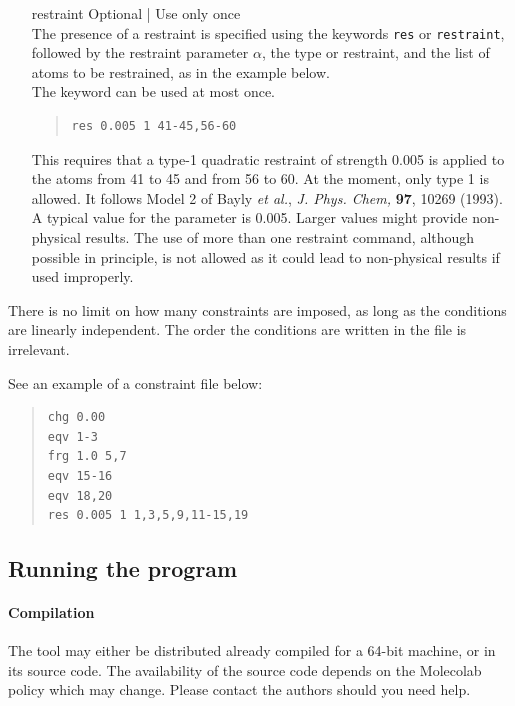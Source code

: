 \documentclass[a4paper]{report}
\begin{document}
\begin{itemize}
\item[restraint] Optional | Use only once \\
The presence of a restraint is specified using the keywords \texttt{res} or \texttt{restraint}, followed by the restraint parameter $\alpha$, the type or restraint, and the list of atoms to be restrained, as in the example below. \\
The keyword can be used at most once.
\begin{framed}
\begin{quote}
\begin{verbatim}
res 0.005 1 41-45,56-60
\end{verbatim}
\end{quote}
\end{framed}
This requires that a type-1 quadratic restraint of strength 0.005 is applied to the atoms from 41 to 45 and from 56 to 60. At the moment, only type 1 is allowed. It follows Model 2 of Bayly \emph{et al.}, \emph{J. Phys. Chem,} \textbf{97}, 10269 (1993). A typical value for the parameter is 0.005. Larger values might provide non-physical results. The use of more than one restraint command, although possible in principle, is not allowed as it could lead to non-physical results if used improperly.

\end{itemize}

There is no limit on how many constraints are imposed, as long as the conditions are
linearly independent. The order the conditions are written in the file is irrelevant.

See an example of a constraint file below:
\begin{framed}
\begin{quote}
\begin{verbatim}
chg 0.00
eqv 1-3
frg 1.0 5,7
eqv 15-16
eqv 18,20
res 0.005 1 1,3,5,9,11-15,19
\end{verbatim}
\end{quote}
\end{framed}

\subsection*{Running the program}

\paragraph*{Compilation}

The tool may either be distributed already compiled for a 64-bit machine, or in its source code. The availability of the source code depends on the Molecolab policy which may change. Please contact the authors should you need help.
\end{document}
